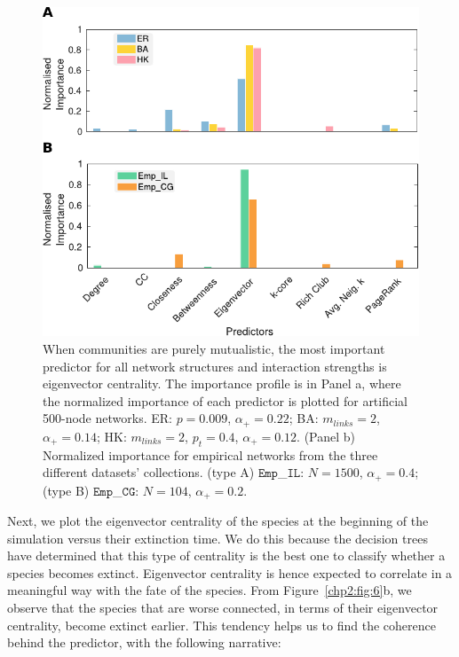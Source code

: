 \begin{figure}
    \centering
    \includegraphics{figures/chp2/fig_7.pdf}
    \caption[Importance profile for mutualism]{When communities are purely mutualistic, the most important predictor for all network structures and interaction strengths is eigenvector centrality. The importance profile is in Panel a, where the normalized importance of each predictor  is plotted for artificial 500-node networks. ER: $p =  0.009$, $\alpha_+ = 0.22$; BA: $m_{links} = 2$, $\alpha_+ = 0.14$; HK: $m_{links} = 2$, $p_t = 0.4$, $\alpha_+ = 0.12$. (Panel b) Normalized importance for empirical networks from the three different datasets' collections. (type A) $\texttt{Emp}$\_$\texttt{IL}$: $N = 1500$, $\alpha_+ = 0.4$; (type B) $\texttt{Emp}$\_$\texttt{CG}$: $N = 104$, $\alpha_+ = 0.2$.}
    \label{chp2:fig:5}
\end{figure} 

Next, we plot the eigenvector centrality of the species at the beginning of the simulation versus their extinction time. We do this because the decision trees have determined that this type of centrality is the best one to classify whether a species becomes extinct. Eigenvector centrality is hence expected to correlate in a meaningful way with the fate of the species. From Figure~\ref{chp2:fig:6}b, we observe that the species that are worse connected, in terms of their eigenvector centrality, become extinct earlier. This tendency helps us to find the coherence behind the predictor, with the following narrative:

